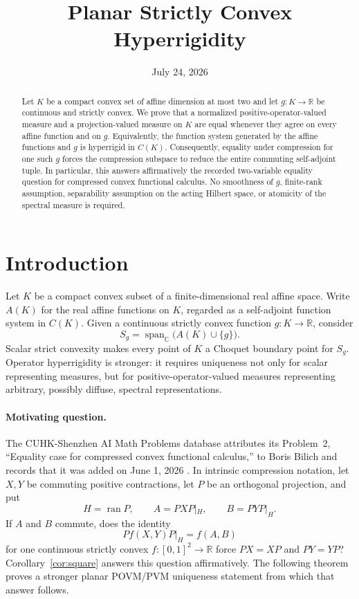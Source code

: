 \documentclass[11pt,a4paper]{amsart}
\title{Planar Strictly Convex Hyperrigidity}
\date{July 24, 2026}
\theoremstyle{remark}
\newcommand{\ran}{\operatorname{ran}}
\begin{document}
\begin{abstract}
Let \(K\) be a compact convex set of affine dimension at most two and let
\(g\colon K\to\mathbb R\) be continuous and strictly convex.
We prove that a normalized positive-operator-valued measure and a
projection-valued measure on \(K\) are equal whenever they agree on every
affine function and on \(g\).
Equivalently, the function system generated by the affine functions and
\(g\) is hyperrigid in \(C(K)\).
Consequently, equality under compression for one such \(g\) forces the
compression subspace to reduce the entire commuting self-adjoint tuple.
In particular, this answers affirmatively the recorded two-variable equality
question for compressed convex functional calculus.
No smoothness of \(g\), finite-rank assumption, separability assumption on
the acting Hilbert space, or atomicity of the spectral measure is required.
\end{abstract}

\maketitle

\section{Introduction}

Let \(K\) be a compact convex subset of a finite-dimensional real affine
space.  Write \(A(K)\) for the real affine functions on \(K\), regarded as a
self-adjoint function system in \(C(K)\).  Given a continuous strictly convex
function \(g\colon K\to\mathbb R\), consider
\[
   S_g=\operatorname{span}_{\mathbb C}\bigl(A(K)\cup\{g\}\bigr).
\]
Scalar strict convexity makes every point of \(K\) a Choquet boundary point
for \(S_g\).  Operator hyperrigidity is stronger: it requires uniqueness not
only for scalar representing measures, but for positive-operator-valued
measures representing arbitrary, possibly diffuse, spectral
representations.

\paragraph{Motivating question.}
The CUHK-Shenzhen AI Math Problems database attributes its Problem~2,
``Equality case for compressed convex functional calculus,'' to Boris Bilich
and records that it was added on June 1, 2026 \cite{CUHKProblem2}.
In intrinsic compression notation, let \(X,Y\) be commuting positive
contractions, let \(P\) be an orthogonal projection, and put
\[
 H=\ran P,\qquad A=PXP|_H,\qquad B=PYP|_H.
\]
If \(A\) and \(B\) commute, does the identity
\[
 P f(X,Y)P|_H=f(A,B)
\]
for one continuous strictly convex \(f\colon[0,1]^2\to\mathbb R\) force
\(PX=XP\) and \(PY=YP\)?  Corollary~\ref{cor:square} answers this question
affirmatively.  The following theorem proves a stronger planar POVM/PVM
uniqueness statement from which that answer follows.
\end{document}
